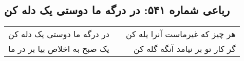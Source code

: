 \begin{center}
\section*{رباعی شماره ۵۴۱: در درگه ما دوستی یک دله کن}
\label{sec:sh541}
\begin{longtable}{l p{0.5cm} r}
در درگه ما دوستی یک دله کن
&&
هر چیز که غیرماست آنرا یله کن
\\
یک صبح به اخلاص بیا بر در ما
&&
گر کار تو بر نیامد آنگه گله کن
\\
\end{longtable}
\end{center}
